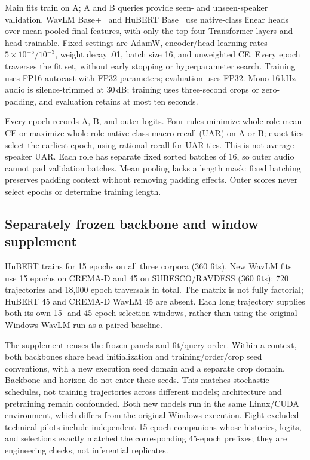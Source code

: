 \documentclass[letterpaper]{article}
\begin{document}
Main fits train on A; A and B queries provide seen- and unseen-speaker validation. WavLM Base+~\cite{wavlm} and HuBERT Base~\cite{hubert} use native-class linear heads over mean-pooled final features, with only the top four Transformer layers and head trainable. Fixed settings are AdamW, encoder/head learning rates $5\times10^{-5}/10^{-3}$, weight decay .01, batch size 16, and unweighted CE. Every epoch traverses the fit set, without early stopping or hyperparameter search. Training uses FP16 autocast with FP32 parameters; evaluation uses FP32. Mono 16\,kHz audio is silence-trimmed at 30\,dB; training uses three-second crops or zero-padding, and evaluation retains at most ten seconds.

Every epoch records A, B, and outer logits. Four rules minimize whole-role mean CE or maximize whole-role native-class macro recall (UAR) on A or B; exact ties select the earliest epoch, using rational recall for UAR ties. This is not average speaker UAR. Each role has separate fixed sorted batches of 16, so outer audio cannot pad validation batches. Mean pooling lacks a length mask: fixed batching preserves padding context without removing padding effects. Outer scores never select epochs or determine training length.

\subsection{Separately frozen backbone and window supplement}
HuBERT trains for 15 epochs on all three corpora (360 fits). New WavLM fits use 15 epochs on CREMA-D and 45 on SUBESCO/RAVDESS (360 fits): 720 trajectories and 18,000 epoch traversals in total. The matrix is not fully factorial; HuBERT 45 and CREMA-D WavLM 45 are absent. Each long trajectory supplies both its own 15- and 45-epoch selection windows, rather than using the original Windows WavLM run as a paired baseline.

The supplement reuses the frozen panels and fit/query order. Within a context, both backbones share head initialization and training/order/crop seed conventions, with a new execution seed domain and a separate crop domain. Backbone and horizon do not enter these seeds. This matches stochastic schedules, not training trajectories across different models; architecture and pretraining remain confounded. Both new models run in the same Linux/CUDA environment, which differs from the original Windows execution. Eight excluded technical pilots include independent 15-epoch companions whose histories, logits, and selections exactly matched the corresponding 45-epoch prefixes; they are engineering checks, not inferential replicates.
\end{document}

